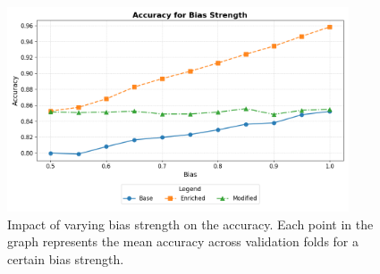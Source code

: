 \begin{figure}[h!]
    \centering
    \includegraphics[width=0.9\textwidth]{gfx/ablation_bias_accuracy.png}
    \caption{Impact of varying bias strength on the accuracy.
    Each point in the graph represents the mean accuracy across validation folds for a certain bias strength.}
    \label{fig:ablation_bias_accuracy}
\end{figure}

